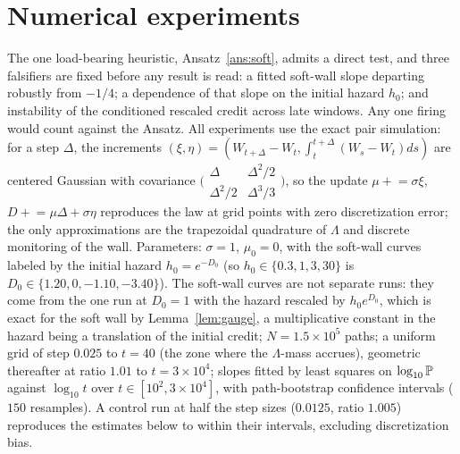 \section{Numerical experiments}\label{sec:numerics}

The one load-bearing heuristic, Ansatz~\ref{ans:soft}, admits a direct
test, and three falsifiers are fixed before any result is read: a
fitted soft-wall slope departing robustly from $-1/4$; a dependence of
that slope on the initial hazard $h_0$; and instability of the
conditioned rescaled credit across late windows. Any one firing would
count against the Ansatz. All experiments use the exact
pair simulation: for a step $\Delta$, the increments
$(\xi,\eta)=(W_{t+\Delta}-W_t,\int_t^{t+\Delta}(W_s-W_t)ds)$ are
centered Gaussian with covariance
$\bigl(\begin{smallmatrix}\Delta&\Delta^2/2\\
\Delta^2/2&\Delta^3/3\end{smallmatrix}\bigr)$, so the update
$\mu\mathrel{+}=\sigma\xi$, $D\mathrel{+}=\mu\Delta+\sigma\eta$
reproduces the law at grid points with zero discretization error; the
only approximations are the trapezoidal quadrature of $\Lambda$ and
discrete monitoring of the wall. Parameters: $\sigma=1$,
$\mu_0=0$, with the soft-wall curves labeled by the initial hazard
$h_0=e^{-D_0}$ (so $h_0\in\{0.3,1,3,30\}$ is $D_0\in\{1.20,0,-1.10,-3.40\}$).
The soft-wall curves are not separate runs: they come from the one run at
$D_0=1$ with the hazard rescaled by $h_0e^{D_0}$, which is exact for the soft
wall by Lemma~\ref{lem:gauge}, a multiplicative constant in the hazard being a
translation of the initial credit;
$N=1.5\times10^5$ paths; a uniform grid of step
$0.025$ to $t=40$ (the zone where the $\Lambda$-mass accrues),
geometric thereafter at ratio $1.01$ to $t=3\times10^4$; slopes fitted
by least squares on $\log_{10}\mathbb{P}$ against $\log_{10}t$ over
$t\in[10^2,3\times10^4]$, with path-bootstrap confidence intervals
($150$ resamples). A control run at half the step sizes
($0.0125$, ratio $1.005$) reproduces the estimates below to within
their intervals, excluding discretization bias.

